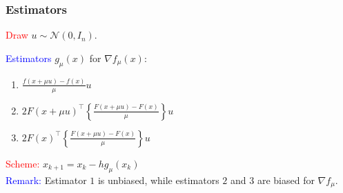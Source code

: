 \documentclass{beamer}
\begin{document}
\begin{frame}
	\frametitle{Estimators}
	
	\textcolor{red}{Draw} $u \sim \mathcal{N}(0,I_n)$. \newline \vspace{0.1in}
	
	\textcolor{blue}{Estimators} $g_{\mu}(x)$ for $\nabla f_{\mu}(x)$: \newline 
	\begin{enumerate}
		\item  $\frac{f(x+\mu u)-f(x)}{\mu}u$
		\item $2F(x+\mu u)^\top\left\{\frac{F(x+\mu u)-F(x)}{\mu}\right\}u$
		\item $2F(x)^\top\left\{\frac{F(x+\mu u)-F(x)}{\mu}\right\}u$
	\end{enumerate}	
	\textcolor{red}{Scheme:} $x_{k+1} = x_k - h g_{\mu}(x_k)$ \\ \vspace{0.25in} 
	\textcolor{blue}{Remark:} Estimator $1$ is unbiased, while estimators $2$ and $3$ are biased for $\nabla f_{\mu}$.

	
	
\end{frame}
\end{document}
